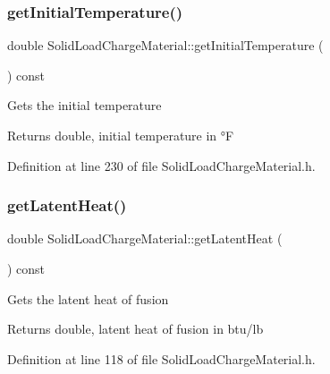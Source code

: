 \subsubsection{\texorpdfstring{get\+Initial\+Temperature()}{getInitialTemperature()}\hspace{0.1cm}{\footnotesize\ttfamily [3/3]}}
{\footnotesize\ttfamily double Solid\+Load\+Charge\+Material\+::get\+Initial\+Temperature (\begin{DoxyParamCaption}{ }\end{DoxyParamCaption}) const\hspace{0.3cm}{\ttfamily [inline]}}

Gets the initial temperature \begin{DoxyReturn}{Returns}
double, initial temperature in °F 
\end{DoxyReturn}


Definition at line 230 of file Solid\+Load\+Charge\+Material.\+h.

\mbox{\label{class_solid_load_charge_material_add60191bd282a9cefa4bf7a60301711b}} 
\subsubsection{\texorpdfstring{get\+Latent\+Heat()}{getLatentHeat()}\hspace{0.1cm}{\footnotesize\ttfamily [1/3]}}
{\footnotesize\ttfamily double Solid\+Load\+Charge\+Material\+::get\+Latent\+Heat (\begin{DoxyParamCaption}{ }\end{DoxyParamCaption}) const\hspace{0.3cm}{\ttfamily [inline]}}

Gets the latent heat of fusion \begin{DoxyReturn}{Returns}
double, latent heat of fusion in btu/lb 
\end{DoxyReturn}


Definition at line 118 of file Solid\+Load\+Charge\+Material.\+h.

\mbox{\label{class_solid_load_charge_material_add60191bd282a9cefa4bf7a60301711b}} 
